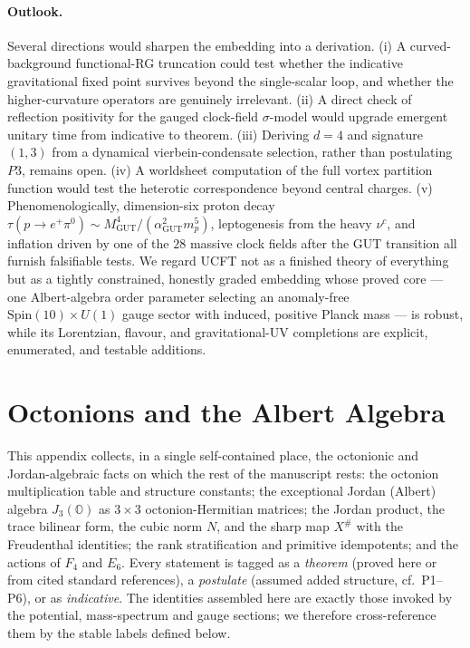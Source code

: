\documentclass[11pt]{article}
\theoremstyle{plain}
\theoremstyle{definition}
\theoremstyle{remark}
\begin{document}
\paragraph{Outlook.}
Several directions would sharpen the embedding into a derivation. (i) A
curved-background functional-RG truncation could test whether the
indicative gravitational fixed point survives beyond the single-scalar
loop, and whether the higher-curvature operators are genuinely
irrelevant. (ii) A direct check of reflection positivity for the gauged
clock-field $\sigma$-model would upgrade emergent unitary time from
indicative to theorem. (iii) Deriving $d=4$ and signature $(1,3)$ from a
dynamical vierbein-condensate selection, rather than postulating $P3$,
remains open. (iv) A worldsheet computation of the full
vortex partition function would test the heterotic correspondence beyond
central charges. (v) Phenomenologically, dimension-six proton decay
$\tau(p\to e^{+}\pi^{0})\sim M_{\mathrm{GUT}}^{4}/(\alpha_{\mathrm{GUT}}^{2}
m_{p}^{5})$, leptogenesis from the heavy $\nu^{c}$, and inflation driven
by one of the $28$ massive clock fields after the GUT transition all
furnish falsifiable tests. We regard UCFT not as a finished theory of
everything but as a tightly constrained, honestly graded embedding whose
proved core --- one Albert-algebra order parameter selecting an
anomaly-free $\mathrm{Spin}(10)\times U(1)$ gauge sector with induced,
positive Planck mass --- is robust, while its Lorentzian, flavour, and
gravitational-UV completions are explicit, enumerated, and testable
additions.


\appendix

\section{Octonions and the Albert Algebra}
\label{sec:app-albert:main}
\label{app:albert:main}

This appendix collects, in a single self-contained place, the octonionic and
Jordan-algebraic facts on which the rest of the manuscript rests: the octonion
multiplication table and structure constants; the exceptional Jordan (Albert)
algebra $J_3(\mathbb O)$ as $3\times 3$ octonion-Hermitian matrices; the Jordan
product, the trace bilinear form, the cubic norm $N$, and the sharp map $X^\#$
with the Freudenthal identities; the rank stratification and primitive
idempotents; and the actions of $F_4$ and $E_6$. Every statement is tagged as a
\emph{theorem} (proved here or from cited standard references), a
\emph{postulate} (assumed added structure, cf.\ P1--P6), or as
\emph{indicative}. The identities assembled here are exactly those invoked by the
potential, mass-spectrum and gauge sections; we therefore cross-reference them by
the stable labels defined below.
\end{document}
